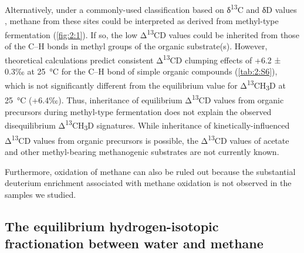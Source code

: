 Alternatively, under a commonly-used classification based on
δ\textsuperscript{13}C and δD values \parencite{Whiticar_1999_CG}, methane from these
sites could be interpreted as derived from methyl-type fermentation
(\autoref{fig:2:1}). If so, the low Δ\textsuperscript{13}CD values could be
inherited from those of the C--H bonds in methyl groups of the organic
substrate(s). However, theoretical calculations predict consistent
Δ\textsuperscript{13}CD clumping effects of +6.2 ± 0.3‰ at 25~°C for the
C--H bond of simple organic compounds (\autoref{tab:2:S6}), which is not
significantly different from the equilibrium value for
Δ\textsuperscript{13}CH\textsubscript{3}D at 25~°C (+6.4‰). Thus,
inheritance of equilibrium Δ\textsuperscript{13}CD values from organic
precursors during methyl-type fermentation does not explain the observed
disequilibrium Δ\textsuperscript{13}CH\textsubscript{3}D signatures.
While inheritance of kinetically-influenced Δ\textsuperscript{13}CD
values from organic precursors is possible, the Δ\textsuperscript{13}CD
values of acetate and other methyl-bearing methanogenic substrates are
not currently known.

Furthermore, oxidation of methane can also be ruled out because the
substantial deuterium enrichment associated with methane oxidation
\parencite{Whiticar_1999_CG} is not observed in the samples we studied.



\subsection{The equilibrium hydrogen-isotopic fractionation between
	water and methane
}\label{the-equilibrium-hydrogen-isotopic-fractionation-between-water-and-methane}

